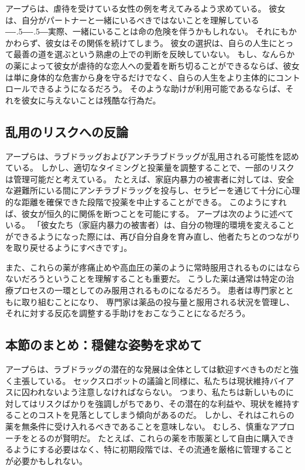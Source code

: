 \documentclass[paper=a4,book,openany]{jlreq}
\def\DDASH{―\kern-.5\zw―\kern-.5\zw―} %
\begin{document}
アープらは、虐待を受けている女性の例を考えてみるよう求めている。
彼女は、自分がパートナーと一緒にいるべきではないことを理解している{\DDASH}実際、一緒にいることは命の危険を伴うかもしれない。
それにもかかわらず、彼女はその関係を続けてしまう。
彼女の選択は、自らの人生にとって最善の道を選ぶという熟慮の上での判断を反映していない。
もし、なんらかの薬によって彼女が虐待的な恋人への愛着を断ち切ることができるならば、彼女は単に身体的な危害から身を守るだけでなく、自らの人生をより主体的にコントロールできるようになるだろう。
そのような助けが利用可能であるならば、それを彼女に与えないことは残酷な行為だ。

\subsection{乱用のリスクへの反論}

アープらは、ラブドラッグおよびアンチラブドラッグが乱用される可能性を認めている。
しかし、適切なタイミングと投薬量を調整することで、一部のリスクは管理可能だと考えている。
たとえば、家庭内暴力の被害者に対しては、安全な避難所にいる間にアンチラブドラッグを投与し、セラピーを通じて十分に心理的な距離を確保できた段階で投薬を中止することができる。
このようにすれば、彼女が恒久的に関係を断つことを可能にする。
アープは次のように述べている。
「彼女たち（家庭内暴力の被害者）は、自分の物理的環境を変えることができるようになった際には、再び自分自身を育み直し、他者たちとのつながりを取り戻せるようにすべきです」\citep{szalavitz14:_is_it_possib_creat_anti_love_drug}。

また、これらの薬が疼痛止めや高血圧の薬のように常時服用されるものにはならないだろうということを理解することも重要だ。
こうした薬は通常は特定の治療プロセスの一環としてのみ服用されるものになるだろう。
患者は専門家とともに取り組むことになり、
専門家は薬品の投与量と服用される状況を管理し、それに対する反応を調整する手助けをおこなうことになるだろう。

\subsection{本節のまとめ：穏健な姿勢を求めて}

アープらは、ラブドラッグの潜在的な発展は全体としては歓迎すべきものだと強く主張している。
セックスロボットの議論と同様に、私たちは現状維持バイアスに囚われないよう注意しなければならない。
つまり、私たちは新しいものに対してはリスクばかりを強調しがちであり、その潜在的な利益や、現状を維持することのコストを見落としてしまう傾向があるのだ。
しかし、それはこれらの薬を無条件に受け入れるべきであることを意味しない。
むしろ、慎重なアプローチをとるのが賢明だ。
たとえば、これらの薬を市販薬として自由に購入できるようにする必要はなく、特に初期段階では、その流通を厳格に管理することが必要かもしれない。
\end{document}
